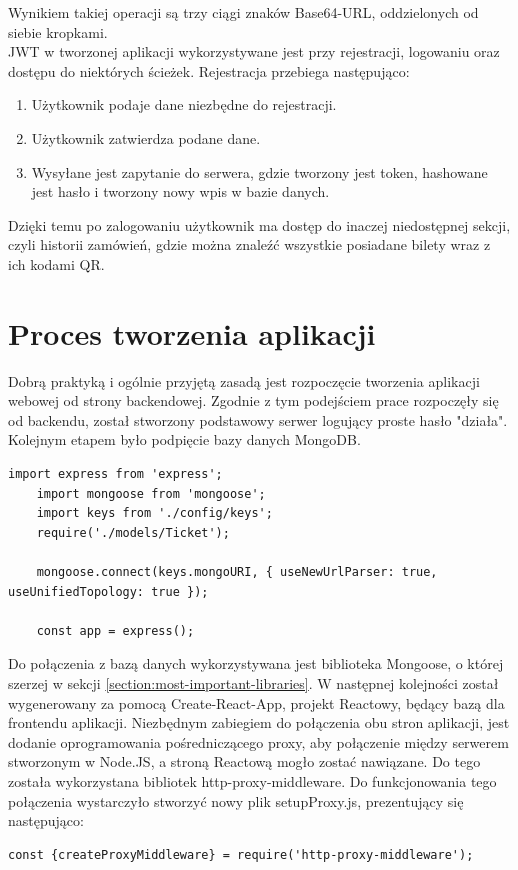 \documentclass[12pt]{article}
\begin{document}
\begin{sloppypar}
{{\begin{figure}[H]
      \label{fig:jwt_signature}
    \end{figure}
    Wynikiem takiej operacji są trzy ciągi znaków Base64-URL, oddzielonych od siebie kropkami.\\
    JWT w tworzonej aplikacji wykorzystywane jest przy rejestracji, logowaniu oraz dostępu do niektórych ścieżek. 
    Rejestracja przebiega następująco:
    \begin{enumerate}
      \item Użytkownik podaje dane niezbędne do rejestracji.
      \item Użytkownik zatwierdza podane dane.
      \item Wysyłane jest zapytanie do serwera, gdzie tworzony jest token, hashowane jest hasło i tworzony nowy wpis w bazie danych.
    \end{enumerate}
    Dzięki temu po zalogowaniu użytkownik ma dostęp do inaczej niedostępnej sekcji, czyli historii zamówień, gdzie można znaleźć wszystkie posiadane bilety wraz z ich kodami QR.
  }
}

\section{Proces tworzenia aplikacji}
{
  Dobrą praktyką i ogólnie przyjętą zasadą jest rozpoczęcie tworzenia aplikacji webowej od strony backendowej. Zgodnie z tym podejściem prace rozpoczęły się od backendu, 
  został stworzony podstawowy serwer logujący proste hasło "działa". Kolejnym etapem było podpięcie bazy danych MongoDB.
  \begin{lstlisting}[caption=Kod odpowiadający za integrację z MongoDB., captionpos=b]
    import express from 'express';
    import mongoose from 'mongoose';
    import keys from './config/keys';
    require('./models/Ticket');

    mongoose.connect(keys.mongoURI, { useNewUrlParser: true, useUnifiedTopology: true });

    const app = express();
  \end{lstlisting}
  Do połączenia z bazą danych wykorzystywana jest biblioteka Mongoose, o której szerzej w sekcji \ref{section:most-important-libraries}.
  W następnej kolejności został wygenerowany za pomocą Create-React-App, projekt Reactowy, będący bazą dla frontendu aplikacji. 
  Niezbędnym zabiegiem do połączenia obu stron aplikacji, jest dodanie oprogramowania pośredniczącego proxy, aby połączenie między serwerem stworzonym w Node.JS, a 
  stroną Reactową mogło zostać nawiązane. Do tego została wykorzystana bibliotek http-proxy-middleware. Do funkcjonowania tego połączenia wystarczyło stworzyć nowy plik 
  setupProxy.js, prezentujący się następująco:
  \begin{lstlisting}[caption=Proxy Middleware do połączenia strony frontendowej z backendową., captionpos=b]
    const {createProxyMiddleware} = require('http-proxy-middleware');


\end{lstlisting}}
\end{sloppypar}
\end{document}
